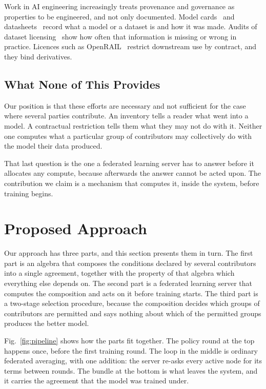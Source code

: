 \documentclass[10pt,conference]{IEEEtran}
\begin{document}
Work in AI engineering increasingly treats provenance and governance as
properties to be engineered, and not only documented. Model
cards~\cite{modelcards} and datasheets~\cite{datasheets} record what a model or
a dataset is and how it was made. Audits of dataset licensing~\cite{provenance}
show how often that information is missing or wrong in practice. Licences such
as OpenRAIL~\cite{openrail} restrict downstream use by contract, and they bind
derivatives.

\subsection{What None of This Provides}

Our position is that these efforts are necessary and not sufficient for the
case where several parties contribute. An inventory tells a reader what went
into a model. A contractual restriction tells them what they may not do with it.
Neither one computes what a particular group of contributors may collectively
do with the model their data produced.

That last question is the one a federated learning server has to answer before
it allocates any compute, because afterwards the answer cannot be acted upon.
The contribution we claim is a mechanism that computes it, inside the system,
before training begins.

\section{Proposed Approach}
\label{sec:algebra}

Our approach has three parts, and this section presents them in turn. The first
part is an algebra that composes the conditions declared by several
contributors into a single agreement, together with the property of that
algebra which everything else depends on. The second part is a federated
learning server that computes the composition and acts on it before training
starts. The third part is a two-stage selection procedure, because the
composition decides which groups of contributors are permitted and says nothing
about which of the permitted groups produces the better model.

Fig.~\ref{fig:pipeline} shows how the parts fit together. The policy round at
the top happens once, before the first training round. The loop in the middle
is ordinary federated averaging, with one addition: the server re-asks every
active node for its terms between rounds. The bundle at the bottom is what
leaves the system, and it carries the agreement that the model was trained
under.
\end{document}
